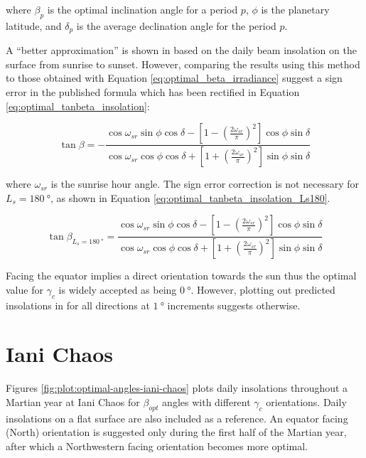 where $\beta_{p}$ is the optimal inclination angle for a period $p$, $\phi$ is the planetary latitude, and $\delta_{p}$ is the average declination angle for the period $p$.

A ``better approximation'' is shown in  based on the daily beam insolation on the surface from sunrise to sunset. However, comparing the results using this method to those obtained with Equation \ref{eq:optimal_beta_irradiance} suggest a sign error in the published formula which has been rectified in Equation  \ref{eq:optimal_tanbeta_insolation}:

\begin{equation}
  \label{eq:optimal_tanbeta_insolation}
  \tan{\beta} = -\frac{\cos{\omega_{sr}}\sin{\phi}\cos{\delta}-\left[1-\left(\frac{2\omega_{sr}}{\pi}\right)^{2}\right]\cos{\phi}\sin{\delta}}{\cos{\omega_{sr}}\cos{\phi}\cos{\delta}+\left[1+\left(\frac{2\omega_{sr}}{\pi}\right)^{2}\right]\sin{\phi}\sin{\delta}}
\end{equation}


where $\omega_{sr}$ is the sunrise hour angle. The sign error correction is not necessary for $L_{s} = \SI{180}{\degree}$, as shown in Equation \ref{eq:optimal_tanbeta_insolation_Ls180}.

\begin{equation}
  \label{eq:optimal_tanbeta_insolation_Ls180}
  \tan{\beta_{L_{s} = \SI{180}{\degree}}} = \frac{\cos{\omega_{sr}}\sin{\phi}\cos{\delta}-\left[1-\left(\frac{2\omega_{sr}}{\pi}\right)^{2}\right]\cos{\phi}\sin{\delta}}{\cos{\omega_{sr}}\cos{\phi}\cos{\delta}+\left[1+\left(\frac{2\omega_{sr}}{\pi}\right)^{2}\right]\sin{\phi}\sin{\delta}}
\end{equation}

Facing the equator implies a direct orientation towards the sun thus the optimal value for $\gamma_{c}$ is widely accepted as being $\SI{0}{\degree}$. However, plotting out predicted insolations in for all directions at $\SI{1}{\degree}$ increments suggests otherwise.

\section{Iani Chaos}

Figures \ref{fig:plot:optimal-angles-iani-chaos} plots daily insolations throughout a Martian year at Iani Chaos for $\beta_{opt}$ angles with different $\gamma_{c}$ orientations. Daily insolations on a flat surface are also included as a reference. An equator facing (North) orientation is suggested only during the first half of the Martian year, after which a Northwestern facing orientation becomes more optimal.

